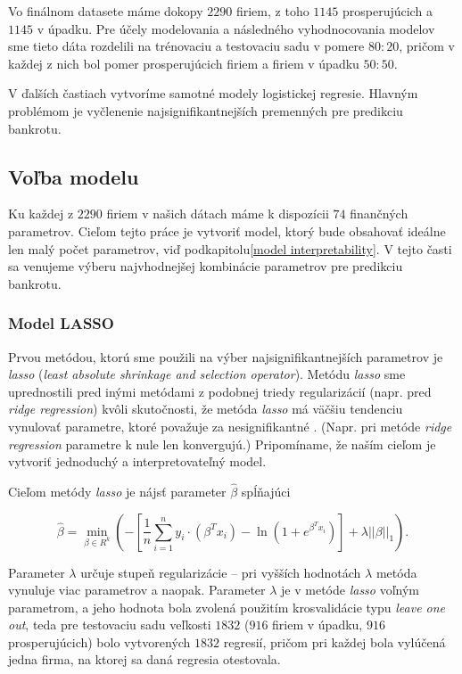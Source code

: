 Vo finálnom datasete máme dokopy \(2290\) firiem, z toho \(1145\) prosperujúcich a \(1145\) v úpadku.
Pre účely modelovania a následného vyhodnocovania modelov sme tieto dáta rozdelili na trénovaciu a testovaciu sadu v pomere \(80:20\),
pričom v každej z nich bol pomer prosperujúcich firiem a firiem v úpadku \(50:50\).

V ďalších častiach vytvoríme samotné modely logistickej regresie. Hlavným problémom je vyčlenenie najsignifikantnejších premenných pre predikciu bankrotu.

\subsection{Voľba modelu}

Ku každej z \(2290\) firiem v našich dátach máme k dispozícii \(74\) finančných parametrov.
Cieľom tejto práce je vytvoriť model, ktorý bude obsahovať ideálne len malý počet parametrov, viď podkapitolu\autoref{model interpretability}.
V tejto časti sa venujeme výberu najvhodnejšej kombinácie parametrov pre predikciu bankrotu.

\subsubsection{Model LASSO}

Prvou metódou, ktorú sme použili na výber najsignifikantnejších parametrov je \emph{lasso} (\emph{least absolute shrinkage and selection operator}).
Metódu \emph{lasso} sme uprednostili pred inými metódami z podobnej triedy regularizácií (napr. pred \emph{ridge regression}) kvôli skutočnosti,
že metóda \emph{lasso} má väčšiu tendenciu vynulovať parametre, ktoré považuje za nesignifikantné \cite{glmnet}.
(Napr. pri metóde \emph{ridge regression} parametre k nule len konvergujú.)
Pripomíname, že naším cieľom je vytvoriť jednoduchý a interpretovateľný model.

Cieľom metódy \emph{lasso} je nájsť parameter \(\hat{\beta}\) spĺňajúci

\[
    \hat{\beta} = \min_{\beta \in R^k} \left( - \left[ \frac{1}{n} \sum_{i = 1}^n y_i \cdot (\beta^T x_i) - \ln{(1 + e^{\beta^T x_i})} \right] + \lambda || \beta ||_1 \right).
\]

Parameter \(\lambda\) určuje stupeň regularizácie – pri vyšších hodnotách \(\lambda\) metóda vynuluje viac parametrov a naopak.
Parameter \(\lambda\) je v metóde \emph{lasso} voľným parametrom, a jeho hodnota bola zvolená použitím krosvalidácie typu \emph{leave one out},
teda pre testovaciu sadu veľkosti \(1832\) (\(916\) firiem v úpadku, \(916\) prosperujúcich) bolo vytvorených \(1832\) regresií,
pričom pri každej bola vylúčená jedna firma, na ktorej sa daná regresia otestovala.

